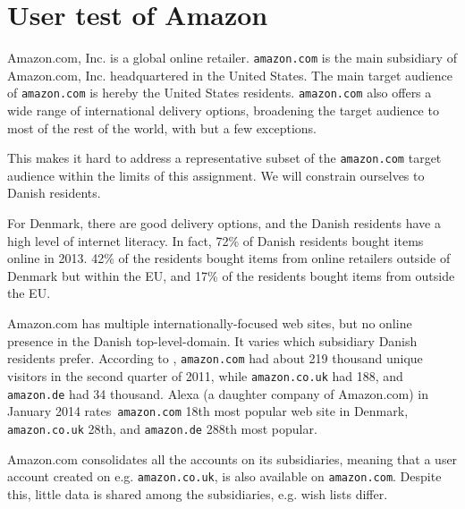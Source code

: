 
\section{User test of Amazon}

Amazon.com, Inc. is a global online retailer. \texttt{amazon.com} is the main
subsidiary of Amazon.com, Inc. headquartered in the United States. The main
target audience of \texttt{amazon.com} is hereby the United States residents.
\texttt{amazon.com} also offers a wide range of international delivery options,
broadening the target audience to most of the rest of the world, with but a
few exceptions.

This makes it hard to address a representative subset of the
\texttt{amazon.com} target audience within the limits of this assignment. We
will constrain ourselves to Danish residents.

For Denmark, there are good delivery options\footnotemark, and the Danish
residents have a high level of internet literacy\cite{bebrit02}. In fact, 72\%
of Danish residents bought items online in 2013\cite{bebrit07}. 42\% of the
residents bought items from online retailers outside of Denmark but within the
EU, and 17\% of the residents bought items from outside the EU\cite{bebrit11}.


Amazon.com has multiple internationally-focused web sites, but no online
presence in the Danish top-level-domain. It varies which subsidiary Danish
residents prefer. According to \cite[FDIM Top 1000]{brug-2012},
\texttt{amazon.com} had about 219 thousand unique visitors in the second
quarter of 2011, while \texttt{amazon.co.uk} had 188, and \texttt{amazon.de}
had 34 thousand. Alexa (a daughter company of Amazon.com) in January 2014
rates\footnotemark~\texttt{amazon.com} 18th most popular web site in Denmark,
\texttt{amazon.co.uk} 28th, and \texttt{amazon.de} 288th most popular.


Amazon.com consolidates all the accounts on its subsidiaries, meaning that a
user account created on e.g. \texttt{amazon.co.uk}, is also available on
\texttt{amazon.com}. Despite this, little data is shared among the
subsidiaries, e.g. wish lists differ.

